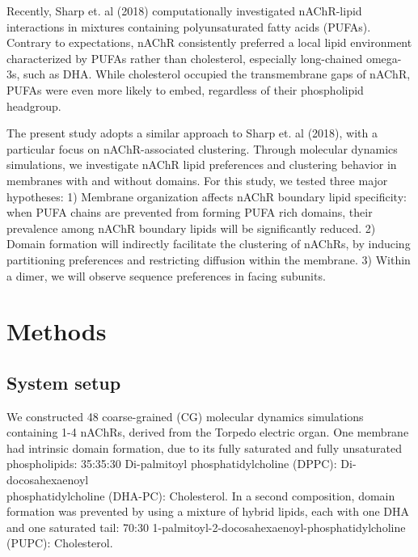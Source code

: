 \documentclass[final,3p,times,twocolumn]{elsarticle}
\begin{document}
Recently, Sharp et. al (2018)\cite{Sharp2018} computationally investigated nAChR-lipid interactions in mixtures containing polyunsaturated fatty acids (PUFAs). Contrary to expectations, nAChR consistently preferred a local lipid environment characterized by PUFAs rather than cholesterol, especially long-chained omega-3s, such as DHA. While cholesterol occupied the transmembrane gaps of nAChR, PUFAs were even more likely to embed, regardless of their phospholipid headgroup. %



The present study adopts a similar approach to Sharp et. al (2018), with a particular focus on nAChR-associated clustering. Through molecular dynamics simulations, we investigate nAChR lipid preferences and clustering behavior in membranes with and without domains. For this study, we tested three major hypotheses: 1) Membrane organization affects nAChR boundary lipid specificity: when PUFA chains are prevented from forming PUFA rich domains, their prevalence among nAChR boundary lipids will be significantly reduced. 2) Domain formation will indirectly facilitate the clustering of nAChRs, by inducing partitioning preferences and restricting diffusion within the membrane. 3) Within a dimer, we will observe sequence preferences in facing subunits.


\section{Methods}
\subsection{System setup}

We constructed 48 coarse-grained (CG) molecular dynamics simulations containing 1-4 nAChRs, derived from the Torpedo electric organ\cite{Unwin2005}. One membrane had intrinsic domain formation, due to its fully saturated and fully unsaturated phospholipids: 35:35:30 Di-palmitoyl phosphatidylcholine (DPPC): Di-docosahexaenoyl\\ phosphatidylcholine (DHA-PC): Cholesterol. In a second composition, domain formation was prevented by using a mixture of hybrid lipids, each with one DHA and one saturated tail: 70:30 1-palmitoyl-2-docosahexaenoyl-phosphatidylcholine (PUPC): Cholesterol. \cite{Marrink2007}
\end{document}
